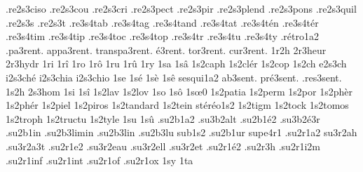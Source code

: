 {                    .re2s3ciso %
                    .re2s3cou
                    .re2s3cri
                    .re2s3pect
                    .re2s3pir
                    .re2s3plend
                    .re2s3pons
                    .re2s3quil
                    .re2s3s
                    .re2s3t
                    .re3s4tab
                    .re3s4tag
                    .re3s4tand
                    .re3s4tat
                    .re3s4t\'en
                    .re3s4t\'er
                    .re3s4tim
                    .re3s4tip
                    .re3s4toc
                    .re3s4top
                    .re3s4tr
                    .re3s4tu
                    .re3s4ty
                    .r\'etro1a2
    .pa3rent.
   appa3rent.
transpa3rent.
    \'e3rent.
    tor3rent.
    cur3rent.
1r2h
                    2r3heur
                    2r3hydr
1ri
1r\^i
1ro
1r\^o
1ru
1r\^u
1ry
1sa
1s\^a
                    1s2caph
                    1s2cl\'er
                    1s2cop
 1s2ch
e2s3ch
i2s3ch\'e
i2s3chia
i2s3chio
1se
1s\'e
1s\`e
1s\^e
                    sesqui1a2
   ab3sent.
pr\'e3sent.
 .res3sent.
1s2h
                    2s3hom
1si
1s\^i
                    1s2lav
                    1s2lov
1so
1s\^o
1s\oe0 %
                    1s2patia
                    1s2perm
                    1s2por
                    1s2ph\`er
                    1s2ph\'er
                    1s2piel
                    1s2piros
                    1s2tandard
                    1s2tein
                    st\'er\'eo1s2
                    1s2tigm
                    1s2tock
                    1s2tomos
                    1s2troph
                    1s2tructu
                    1s2tyle
1su
1s\^u
                    .su2b1a2
                    .su3b2alt
                    .su2b1\'e2
                    .su3b2\'e3r
                    .su2b1in
                    .su2b3limin
                    .su2b3lin
                    .su2b3lu
                    sub1s2
                    .su2b1ur
                    supe4r1
                    .su2r1a2
                    su3r2ah
                    .su3r2a3t
                    .su2r1e2
                    .su3r2eau
                    .su3r2ell
                    .su3r2et
                    .su2r1\'e2
                    .su2r3h
                    .su2r1i2m
                    .su2r1inf
                    .su2r1int
                    .su2r1of
                    .su2r1ox
1sy
1ta
}

